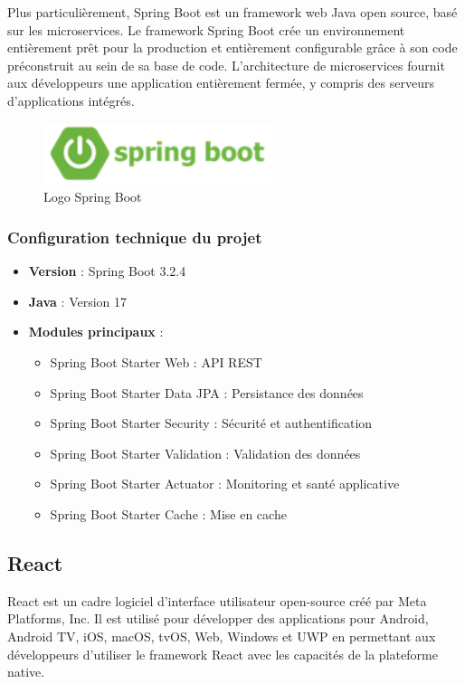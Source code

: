 \documentclass[12pt,a4paper]{report}
\begin{document}
Plus particulièrement, Spring Boot est un framework web Java open source, basé sur les microservices. Le framework Spring Boot crée un environnement entièrement prêt pour la production et entièrement configurable grâce à son code préconstruit au sein de sa base de code. L'architecture de microservices fournit aux développeurs une application entièrement fermée, y compris des serveurs d'applications intégrés.

\begin{figure}[H]
\centering
\includegraphics[width=0.6\textwidth]{latex_media/media/image23.png}
\caption{Logo Spring Boot}
\label{fig:logo-spring-boot}
\end{figure}

\subsubsection{Configuration technique du projet}

\begin{itemize}
\item \textbf{Version} : Spring Boot 3.2.4
\item \textbf{Java} : Version 17
\item \textbf{Modules principaux} :
  \begin{itemize}
  \item Spring Boot Starter Web : API REST
  \item Spring Boot Starter Data JPA : Persistance des données
  \item Spring Boot Starter Security : Sécurité et authentification
  \item Spring Boot Starter Validation : Validation des données
  \item Spring Boot Starter Actuator : Monitoring et santé applicative
  \item Spring Boot Starter Cache : Mise en cache
  \end{itemize}
\end{itemize}

\subsection{React}

React est un cadre logiciel d'interface utilisateur open-source créé par Meta Platforms, Inc. Il est utilisé pour développer des applications pour Android, Android TV, iOS, macOS, tvOS, Web, Windows et UWP en permettant aux développeurs d'utiliser le framework React avec les capacités de la plateforme native.
\end{document}
